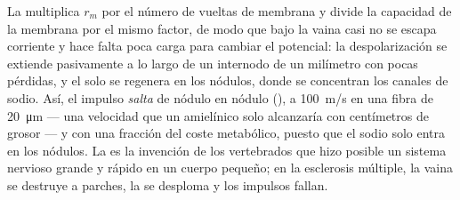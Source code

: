 \begin{proposition}\label{prop:b2:neurons-synapses:myelin}
La  multiplica $r_m$ por el número de vueltas de membrana y divide
la capacidad de la membrana por el mismo factor, de modo que bajo la vaina
casi no se escapa corriente y hace falta poca carga para cambiar el
potencial: la despolarización se extiende pasivamente a lo largo de un
internodo de un milímetro con pocas pérdidas, y el 
solo se regenera en los nódulos, donde se concentran los canales de sodio.
Así, el impulso \emph{salta} de nódulo en nódulo
(\emph{}), a \qty{100}{m/s} en una fibra de
\qty{20}{\micro m} --- una velocidad que un  amielínico solo
alcanzaría con centímetros de grosor --- y con una fracción del coste
metabólico, puesto que el sodio solo entra en los nódulos. La  es
la invención de los vertebrados que hizo posible un sistema nervioso
grande y rápido en un cuerpo pequeño; en la esclerosis múltiple, la vaina
se destruye a parches, la  se desploma y los
impulsos fallan.
\end{proposition}
